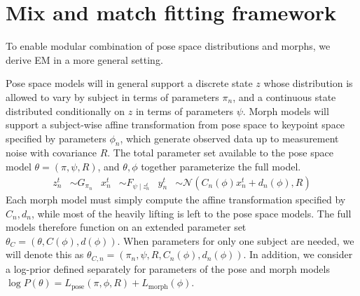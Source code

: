 \documentclass{article}         %
\newcommand{\NN}{\mathcal{N}}
\begin{document}
\section{Mix and match fitting framework}

To enable modular combination of pose space distributions and morphs, we derive EM in a more general setting.

Pose space models will in general support a discrete state $z$ whose distribution is allowed to vary by subject in terms of parameters $\pi_n$, and a continuous state distributed conditionally on $z$ in terms of parameters $\psi$. Morph models will support a subject-wise affine transformation from pose space to keypoint space specified by parameters $\phi_n$, which generate observed data up to measurement noise with covariance $R$. The total parameter set available to the pose space model $\theta = (\pi, \psi, R)$, and $\theta, \phi$ together parameterize the full model.
\begin{align}
    z^t_n &\sim G_{\pi_n} &
    x^t_n &\sim F_{\psi \mid z^t_n} &
    y^t_n &\sim \NN(C_n(\phi) x_n^t + d_n(\phi), R)
\end{align}
Each morph model must simply compute the affine transformation specified by $C_n, d_n$, while most of the heavily lifting is left to the pose space models.
The full models therefore function on an extended parameter set $\theta_C = (\theta, C(\phi), d(\phi))$. When parameters for only one subject are needed, we will
denote this as $\theta_{C,n} = (\pi_n, \psi, R, C_n(\phi), d_n(\phi))$. In addition, we consider a log-prior defined separately for parameters of the pose and morph models $\log P(\theta) = L_{\text{pose}}(\pi, \phi, R) + L_{\text{morph}}(\phi)$. 
\end{document}
